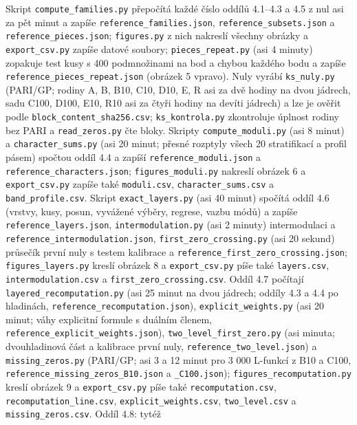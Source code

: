 \documentclass[
  10pt,
]{article}
\begin{document}
Skript \texttt{compute\_families.py} přepočítá každé číslo oddílů
4.1--4.3 a 4.5 z nul asi za pět minut a zapíše
\texttt{reference\_families.json}, \texttt{reference\_subsets.json} a
\texttt{reference\_pieces.json}; \texttt{figures.py} z nich nakreslí
všechny obrázky a \texttt{export\_csv.py} zapíše datové soubory;
\texttt{pieces\_repeat.py} (asi 4 minuty) zopakuje test kusy s 400
podmnožinami na bod a chybou každého bodu a zapíše
\texttt{reference\_pieces\_repeat.json} (obrázek 5 vpravo). Nuly vyrábí
\texttt{ks\_nuly.py} (PARI/GP; rodiny A, B, B10, C10, D10, E, R asi za
dvě hodiny na dvou jádrech, sadu C100, D100, E10, R10 asi za čtyři
hodiny na devíti jádrech) a lze je ověřit podle
\texttt{block\_content\_sha256.csv}; \texttt{ks\_kontrola.py}
zkontroluje úplnost rodiny bez PARI a \texttt{read\_zeros.py} čte bloky.
Skripty \texttt{compute\_moduli.py} (asi 8 minut) a
\texttt{character\_sums.py} (asi 20 minut; přesné rozptyly všech 20
stratifikací a profil pásem) spočtou oddíl 4.4 a zapíší
\texttt{reference\_moduli.json} a \texttt{reference\_characters.json};
\texttt{figures\_moduli.py} nakreslí obrázek 6 a \texttt{export\_csv.py}
zapíše také \texttt{moduli.csv}, \texttt{character\_sums.csv} a
\texttt{band\_profile.csv}. Skript \texttt{exact\_layers.py} (asi 40
minut) spočítá oddíl 4.6 (vrstvy, kusy, posun, vyvážené výběry, regrese,
vazbu módů) a zapíše \texttt{reference\_layers.json},
\texttt{intermodulation.py} (asi 2 minuty) intermodulaci a
\texttt{reference\_intermodulation.json},
\texttt{first\_zero\_crossing.py} (asi 20 sekund) průsečík první nuly s
testem kalibrace a \texttt{reference\_first\_zero\_crossing.json};
\texttt{figures\_layers.py} kreslí obrázek 8 a \texttt{export\_csv.py}
píše také \texttt{layers.csv}, \texttt{intermodulation.csv} a
\texttt{first\_zero\_crossing.csv}. Oddíl 4.7 počítají
\texttt{layered\_recomputation.py} (asi 25 minut na dvou jádrech; oddíly
4.3 a 4.4 po hladinách, \texttt{reference\_recomputation.json}),
\texttt{explicit\_weights.py} (asi 20 minut; váhy explicitní formule s
duálním členem, \texttt{reference\_explicit\_weights.json}),
\texttt{two\_level\_first\_zero.py} (asi minuta; dvouhladinová část a
kalibrace první nuly, \texttt{reference\_two\_level.json}) a
\texttt{missing\_zeros.py} (PARI/GP; asi 3 a 12 minut pro 3 000 L-funkcí
z B10 a C100, \texttt{reference\_missing\_zeros\_B10.json} a
\texttt{\_C100.json}); \texttt{figures\_recomputation.py} kreslí obrázek
9 a \texttt{export\_csv.py} píše také \texttt{recomputation.csv},
\texttt{recomputation\_line.csv}, \texttt{explicit\_weights.csv},
\texttt{two\_level.csv} a \texttt{missing\_zeros.csv}. Oddíl 4.8: tytéž
\end{document}
